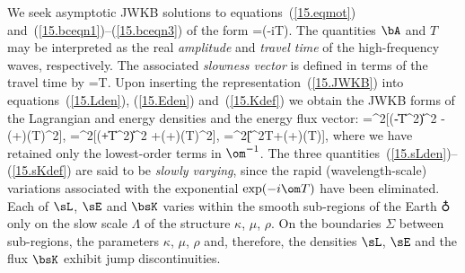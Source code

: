 We seek asymptotic JWKB solutions to equations~(\ref{15.eqmot})
and~(\ref{15.bceqn1})--(\ref{15.bceqn3}) of the form
%
\eq \label{15.JWKB}
\bs=\bA\exp(-i\om T).
\en
The quantities $\bA$ and $T$ may be interpreted as the real
{\em amplitude\/} and {\em travel time\/}
%
%
%
%
%
of the high-frequency
waves, respectively.  The associated {\em slowness vector\/}
%
%
is defined in terms of the travel time by
\eq \label{15.slowdef}
\bp=\bdel T.
\en
Upon inserting the representation~(\ref{15.JWKB}) into
equations~(\ref{15.Lden}), (\ref{15.Eden}) and~(\ref{15.Kdef})
we obtain the JWKB forms of the Lagrangian and energy
%
%
%
%
%
%
densities and the energy flux vector:
\eq \label{15.sLden}
\sL=\half\om^2[(\rho-\mu\|\bdel T\|^2)\|\bA\|^2
-(\kappa+\third\mu)(\bdel T\cdot\bA)^2],
\en
\eq \label{15.sEden}
\sE=\half\om^2[(\rho+\mu\|\bdel T\|^2)\|\bA\|^2
+(\kappa+\third\mu)(\bdel T\cdot\bA)^2],\en
\eq \label{15.sKdef}
\bsK=\om^2[\mu\|\bA\|^2\bdel T+(\kappa+\third\mu)(\bdel T\cdot\bA)\bA],
\en
where we have retained only the lowest-order terms in $\om^{-1}$.
The three quantities~(\ref{15.sLden})--(\ref{15.sKdef}) are said to be
{\em slowly varying\/}, since the rapid (wavelength-scale) variations
associated with the exponential $\exp(-i\om T)$ have been eliminated.
Each of $\sL$, $\sE$ and $\bsK$ varies within the smooth sub-regions
of the Earth $\earth$ only on the slow scale $\Lambda$ of the structure
$\kappa$, $\mu$, $\rho$.  On the boundaries $\Sigma$ between sub-regions,
the parameters $\kappa$, $\mu$, $\rho$ and, therefore, the densities
$\sL$, $\sE$ and the flux $\bsK$ exhibit jump discontinuities.

